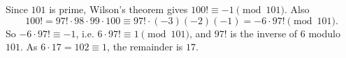 Since $101$ is prime, Wilson's theorem gives $100!\equiv-1\pmod{101}$. Also
\[100!=97!\cdot98\cdot99\cdot100\equiv97!\cdot(-3)(-2)(-1)=-6\cdot97!\pmod{101}.\]
So $-6\cdot97!\equiv-1$, i.e. $6\cdot97!\equiv1\pmod{101}$, and $97!$ is the inverse of $6$ modulo $101$. As $6\cdot17=102\equiv1$, the remainder is $\boxed{17}$.
